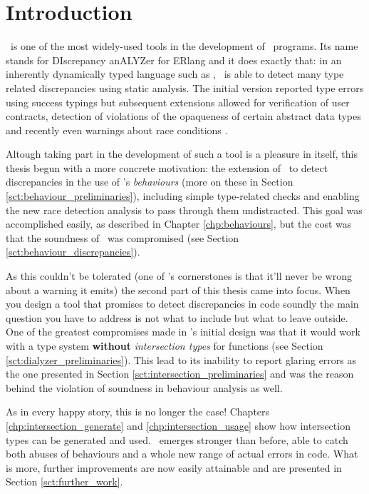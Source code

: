 \chapter{Introduction}

\dr\ is one of the most widely-used tools in the development of
\er\ programs. Its name stands for DIscrepancy anALYZer for ERlang and
it does exactly that: in an inherently dynamically typed language such
as \er, \dr\ is able to detect many type related discrepancies using
static analysis. The initial version reported type errors using
success typings but subsequent extensions allowed for verification of
user contracts, detection of violations of the opaqueness of certain
abstract data types and recently even warnings about race conditions
\cite{Races@PADL-10, springerlink:10.1007/978-3-540-30477-7_7,
  SuccessTypings@PPDP-06, opaques}.

Altough taking part in the development of such a tool is a pleasure in
itself, this thesis begun with a more concrete motivation: the
extension of \dr\ to detect discrepancies in the use of \er's
\emph{behaviours} (more on these in
Section \ref{sct:behaviour_preliminaries}), including simple
type-related checks and enabling the new race detection analysis to
pass through them undistracted. This goal was accomplished easily, as
described in Chapter \ref{chp:behaviours}, but the cost was that the
soundness of \dr\ was compromised (see Section
\ref{sct:behaviour_discrepancies}).

As this couldn't be tolerated (one of \dr's cornerstones is that it'll
never be wrong about a warning it emits) the second part of this
thesis came into focus. When you design a tool that promises to detect
discrepancies in code soundly the main question you have to address is
not what to include but what to leave outside. One of the greatest
compromises made in \dr's initial design was that it would work with a
type system \textbf{without} \emph{intersection types} for functions
(see Section \ref{sct:dialyzer_preliminaries}). This lead to its
inability to report glaring errors as the one presented in Section
\ref{sct:intersection_preliminaries} and was the reason behind the
violation of soundness in behaviour analysis as well.

As in every happy story, this is no longer the case! Chapters
\ref{chp:intersection_generate} and \ref{chp:intersection_usage} show
how intersection types can be generated and used. \dr\ emerges
stronger than before, able to catch both abuses of behaviours and a
whole new range of actual errors in code. What is more, further
improvements are now easily attainable and are presented in Section
\ref{sct:further_work}.
